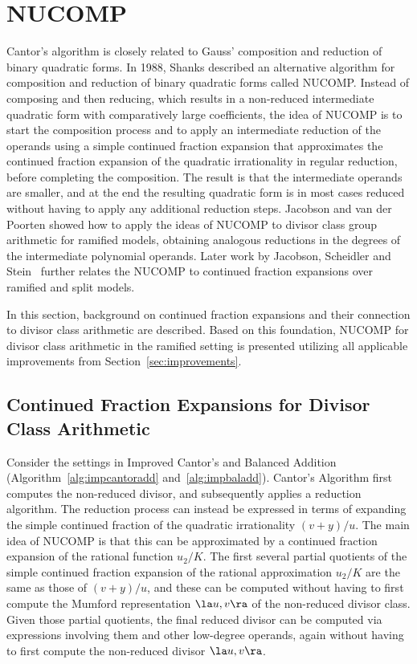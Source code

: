 \newpage
\section{NUCOMP}\label{sec:NUCOMP} 

Cantor's algorithm  is closely related to Gauss' composition and reduction of
binary quadratic forms.  In 1988, Shanks \cite{ShanksNUCOMP} described an
alternative algorithm for composition and reduction of binary quadratic forms
called NUCOMP.  Instead of composing and then reducing, which results in a
non-reduced intermediate quadratic form with comparatively large coefficients,
the idea of NUCOMP is to start the composition process and to apply an
intermediate reduction of the operands using a simple continued fraction
expansion that approximates the continued fraction expansion of the quadratic
irrationality in regular reduction, before completing the composition.  The
result is that the intermediate operands are smaller, and at the end the
resulting quadratic form is in most cases reduced without having to apply any
additional reduction steps.  Jacobson and van der Poorten
\cite{jacobson_nucomp_2002} showed how to apply the ideas of NUCOMP to divisor
class group arithmetic for ramified models, obtaining analogous reductions in the degrees of the
intermediate polynomial operands. Later work by Jacobson, Scheidler and
Stein~\cite{jacobson_fast_2007} further relates the NUCOMP to continued fraction
expansions over ramified and split models.

In this section, background on continued fraction expansions and their
connection to divisor class arithmetic are described. Based on this foundation,
NUCOMP for divisor class arithmetic in the ramified setting is presented
utilizing all applicable improvements from Section~\ref{sec:improvements}.

\subsection{Continued Fraction Expansions for Divisor Class Arithmetic}
Consider the settings in Improved Cantor's and Balanced Addition
(Algorithm~\ref{alg:impcantoradd} and~\ref{alg:impbaladd}). Cantor's Algorithm
first computes the non-reduced divisor, and subsequently applies a reduction
algorithm. The reduction process can instead be expressed in terms of expanding
the simple continued fraction of the quadratic irrationality $(v +y)/u$. The
main idea of NUCOMP is that this can be approximated by a continued fraction
expansion of the rational function $u_2/K$. The first several partial quotients
of the simple continued fraction expansion of the rational approximation $u_2/K$
are the same as those of $(v+y)/u$, and these can be computed without having to
first compute the Mumford representation $\la u,v \ra$ of the non-reduced
divisor class. Given those partial quotients, the final reduced divisor can be
computed via expressions involving them and other low-degree operands, again
without having to first compute the non-reduced divisor $\la u,v \ra$. 

